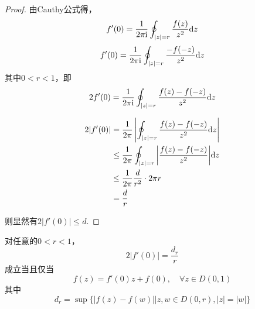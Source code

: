 \begin{proof}

    由\textup{Cauthy}公式得，
    $$f'(0) = \dfrac{1}{2\pi \mathrm{i}} \oint_{|z| = r}{\dfrac{f(z)}{z^2}}\mathrm{d} z$$
    $$f'(0) = \dfrac{1}{2\pi \mathrm{i}} \oint_{|z| = r}{\dfrac{-f(-z)}{z^2}}\mathrm{d} z$$
    其中$0 < r < 1$，即
    $$2f'(0) = \dfrac{1}{2\pi \mathrm{i}} \oint_{|z| = r}{\dfrac{f(z)-f(-z)}{z^2}}\mathrm{d} z$$

    \begin{align*}
        2|f'(0)| & = \dfrac{1}{2 \pi} \left| \oint_{|z| = r}{\dfrac{f(z)-f(-z)}{z^2}}\mathrm{d} z \right| \\
        & \leq \dfrac{1}{2 \pi} \oint_{|z|=r}{\left|\dfrac{f(z)-f(-z)}{z^2}\right|}\mathrm{d} z\\
        & \leq \dfrac{1}{2 \pi} \dfrac{d}{r^2} \cdot 2 \pi r\\
        & = \dfrac{d}{r}
    \end{align*}

    则显然有$2|f'(0)| \leq d$.

\end{proof}

\begin{theorem}\label{theorem:complex}

    对任意的$0 < r < 1$，
    $$2|f'(0)| = \dfrac{d_r}{r}$$
    成立当且仅当
    $$f(z) = f'(0)z + f(0), \quad \forall z \in D(0,1)$$
    其中
    $$d_r = \sup\{|f(z) - f(w)|\big| z,w \in D(0,r), |z| = |w|\}$$
    
\end{theorem}

